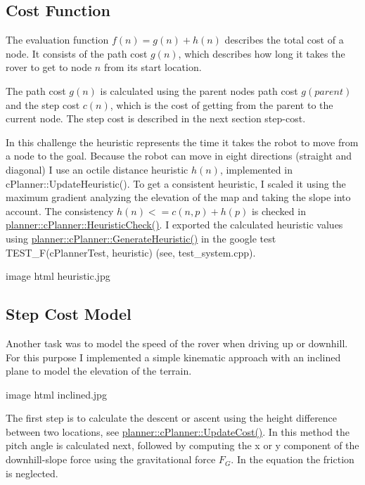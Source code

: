 \subsection*{Cost Function}

The evaluation function $f(n) = g(n) + h(n)$ describes the total cost of a node. It consists of the path cost $g(n)$, which describes how long it takes the rover to get to node $n$ from its start location.

The path cost $g(n)$ is calculated using the parent node\textquotesingle{}s path cost $g(parent)$ and the step cost $c(n)$, which is the cost of getting from the parent to the current node. The step cost is described in the next section step-\/cost.

In this challenge the heuristic represents the time it takes the robot to move from a node to the goal. Because the robot can move in eight directions (straight and diagonal) I use an octile distance heuristic $h(n)$, implemented in c\+Planner\+::\+Update\+Heuristic(). To get a consistent heuristic, I scaled it using the maximum gradient analyzing the elevation of the map and taking the slope into account. The consistency $ h(n) <= c(n,p) + h(p)$ is checked in \mbox{\hyperlink{classplanner_1_1c_planner_a8b4f67bd192db4784c6ab95c11e51a16}{planner\+::c\+Planner\+::\+Heuristic\+Check()}}. I exported the calculated heuristic values using \mbox{\hyperlink{classplanner_1_1c_planner_a1a4650050656545744796296a653d388}{planner\+::c\+Planner\+::\+Generate\+Heuristic()}} in the google test T\+E\+S\+T\+\_\+\+F(c\+Planner\+Test, heuristic) (see, test\+\_\+system.\+cpp).

image html heuristic.\+jpg



\subsection*{Step Cost Model}

Another task was to model the speed of the rover when driving up or downhill. For this purpose I implemented a simple kinematic approach with an inclined plane to model the elevation of the terrain.

image html inclined.\+jpg



The first step is to calculate the descent or ascent using the height difference between two locations, see \mbox{\hyperlink{classplanner_1_1c_planner_a82e45fc2701e90d3fa9df72f475e455e}{planner\+::c\+Planner\+::\+Update\+Cost()}}. In this method the pitch angle is calculated next, followed by computing the x or y component of the downhill-\/slope force using the gravitational force $F_G$. In the equation the friction is neglected.

